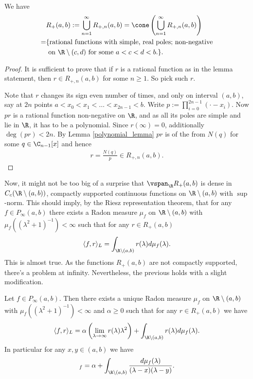 \begin{lem}
	We have
	\begin{align*}
		&R_{+}(a, b) := \bigcup_{n = 1}^{\infty} R_{+, n}(a, b) = \cone\left( \bigcup_{n = 1}^{\infty} R_{+, n}(a, b)\right) \\
		= &\{ \text{rational functions with simple, real poles; non-negative} \\
		& \text{ on $\R \setminus (c, d)$ for some $a < c < d < b$.} \}.
	\end{align*}
\end{lem}
\begin{proof}
	It is sufficient to prove that if $r$ is a rational function as in the lemma statement, then $r \in R_{+, n}(a, b)$ for some $n \geq 1$. So pick such $r$.

	Note that $r$ changes its sign even number of times, and only on interval $(a, b)$, say at $2 n$ points $a < x_{0} < x_{1} < \ldots < x_{2 n - 1} < b$. Write $p := \prod_{i = 0}^{2 n - 1} (\cdot - x_{i})$. Now $pr$ is a rational function non-negative on $\R$, and as all its poles are simple and lie in $\R$, it has to be a polynomial. Since $r(\infty) = 0$, additionally $\deg(p r) < 2 n$. By Lemma \ref{polynomial_lemma} $pr$ is of the from $N(q)$ for some $q \in \C_{n - 1}[x]$ and hence
	\begin{align*}
		r = \frac{N(q)}{p} \in R_{+, n}(a, b).
	\end{align*}
\end{proof}

Now, it might not be too big of a surprise that $\vspan_{\R} R_{+}(a, b)$ is dense in $C_{c}(\R \setminus (a, b))$, compactly supported continuous functions on $\R \setminus (a, b)$ with $\sup$-norm. This should imply, by the Riesz representation theorem, that for any $f \in P_{\infty}(a, b)$ there exists a Radon measure $\mu_{f}$ on $\R \setminus (a, b)$ with $\mu_{f}((\lambda^2 + 1)^{-1}) < \infty$ such that for any $r \in R_{+}(a, b)$
\begin{align*}
	\langle f, r \rangle_{L} = \int_{\R \setminus (a, b)} r(\lambda) d \mu_{f}(\lambda).
\end{align*}
This is almost true. As the functions $R_{+}(a, b)$ are not compactly supported, there's a problem at infinity.  Nevertheless, the previous holds with a slight modification.

\begin{lause}\label{integral_loewner}
	Let $f \in P_{\infty}(a, b)$. Then there exists a unique Radon measure $\mu_{f}$ on $\R \setminus (a, b)$ with $\mu_{f}((\lambda^2 + 1)^{-1}) < \infty$ and $\alpha \geq 0$ such that for any $r \in R_{+}(a, b)$ we have
	\begin{align*}
		\langle f, r \rangle_{L} = \alpha \left(\lim_{\lambda \to \infty} r(\lambda) \lambda^2 \right) + \int_{\R \setminus (a, b)} r(\lambda) d \mu_{f}(\lambda).
	\end{align*}
	In particular for any $x,y \in (a, b)$ we have
	\begin{align*}
		[x, y]_{f} = \alpha + \int_{\R \setminus (a, b)} \frac{d \mu_{f}(\lambda)}{(\lambda - x) (\lambda - y)}.
	\end{align*}
\end{lause}

